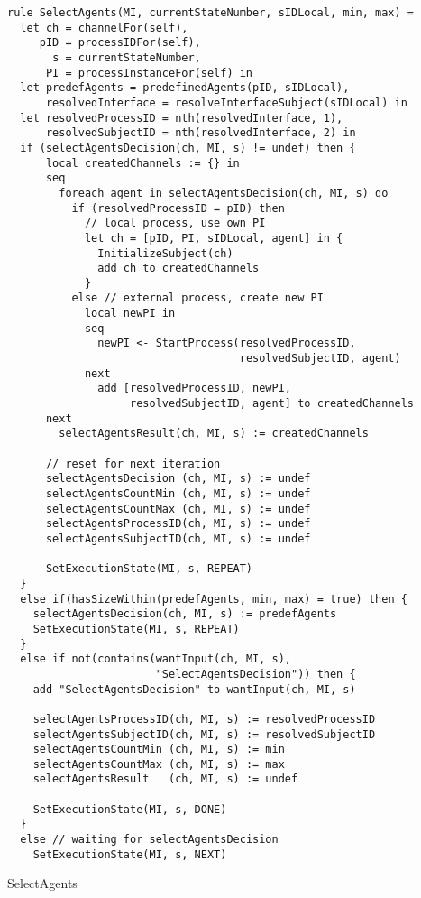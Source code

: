 \begin{listing}[H]
\begin{verbatim}
rule SelectAgents(MI, currentStateNumber, sIDLocal, min, max) =
  let ch = channelFor(self),
     pID = processIDFor(self),
       s = currentStateNumber,
      PI = processInstanceFor(self) in
  let predefAgents = predefinedAgents(pID, sIDLocal),
      resolvedInterface = resolveInterfaceSubject(sIDLocal) in
  let resolvedProcessID = nth(resolvedInterface, 1),
      resolvedSubjectID = nth(resolvedInterface, 2) in
  if (selectAgentsDecision(ch, MI, s) != undef) then {
      local createdChannels := {} in
      seq
        foreach agent in selectAgentsDecision(ch, MI, s) do
          if (resolvedProcessID = pID) then
            // local process, use own PI
            let ch = [pID, PI, sIDLocal, agent] in {
              InitializeSubject(ch)
              add ch to createdChannels
            }
          else // external process, create new PI
            local newPI in
            seq
              newPI <- StartProcess(resolvedProcessID,
                                    resolvedSubjectID, agent)
            next
              add [resolvedProcessID, newPI,
                   resolvedSubjectID, agent] to createdChannels
      next
        selectAgentsResult(ch, MI, s) := createdChannels

      // reset for next iteration
      selectAgentsDecision (ch, MI, s) := undef
      selectAgentsCountMin (ch, MI, s) := undef
      selectAgentsCountMax (ch, MI, s) := undef
      selectAgentsProcessID(ch, MI, s) := undef
      selectAgentsSubjectID(ch, MI, s) := undef

      SetExecutionState(MI, s, REPEAT)
  }
  else if(hasSizeWithin(predefAgents, min, max) = true) then {
    selectAgentsDecision(ch, MI, s) := predefAgents
    SetExecutionState(MI, s, REPEAT)
  }
  else if not(contains(wantInput(ch, MI, s),
                       "SelectAgentsDecision")) then {
    add "SelectAgentsDecision" to wantInput(ch, MI, s)

    selectAgentsProcessID(ch, MI, s) := resolvedProcessID
    selectAgentsSubjectID(ch, MI, s) := resolvedSubjectID
    selectAgentsCountMin (ch, MI, s) := min
    selectAgentsCountMax (ch, MI, s) := max
    selectAgentsResult   (ch, MI, s) := undef

    SetExecutionState(MI, s, DONE)
  }
  else // waiting for selectAgentsDecision
    SetExecutionState(MI, s, NEXT)
\end{verbatim}
\caption{SelectAgents}
\label{lst:asm:SelectAgents}
\end{listing}
